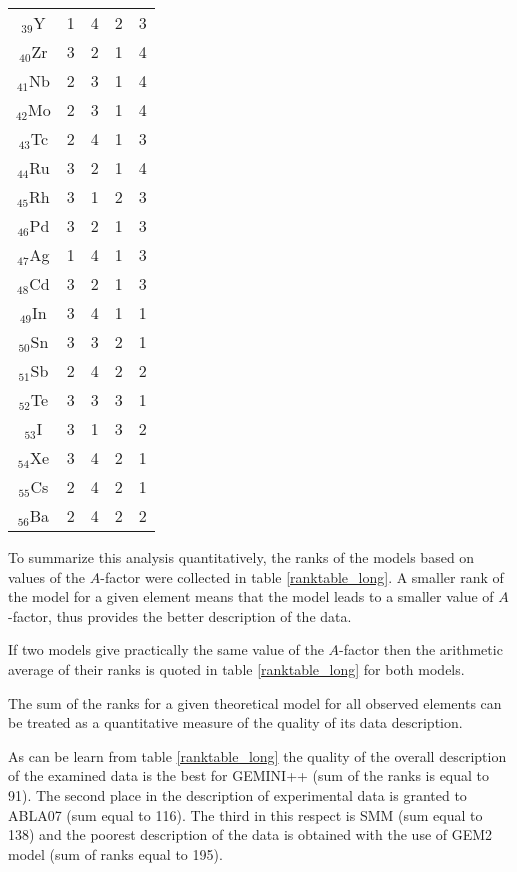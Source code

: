 \begin{longtable}[c]{| c || c |c|c|c|}
$_{39}$Y & 1 & 4 & 2 & 3 \\
$_{40}$Zr & 3 & 2 & 1 & 4 \\
$_{41}$Nb & 2 & 3 & 1 & 4 \\
$_{42}$Mo & 2 & 3 & 1 & 4 \\
$_{43}$Tc & 2 & 4 & 1 & 3 \\
$_{44}$Ru & 3 & 2 & 1 & 4 \\
$_{45}$Rh & 3 & 1 & 2 & 3 \\
$_{46}$Pd & 3 & 2 & 1 & 3 \\
$_{47}$Ag & 1 & 4 & 1 & 3 \\
$_{48}$Cd & 3 & 2 & 1 & 3 \\
$_{49}$In & 3 & 4 & 1 & 1 \\
$_{50}$Sn & 3 & 3 & 2 & 1 \\
$_{51}$Sb & 2 & 4 & 2 & 2 \\
$_{52}$Te & 3 & 3 & 3 & 1 \\
$_{53}$I & 3 & 1 & 3 & 2 \\
$_{54}$Xe & 3 & 4 & 2 & 1 \\
$_{55}$Cs & 2 & 4 & 2 & 1 \\
$_{56}$Ba & 2 & 4 & 2 & 2 \\
\end{longtable}
To summarize this analysis quantitatively, the ranks 
of the models based on values of the $A$-factor were collected
in table \ref{ranktable_long}.
A smaller rank of the model for a given element
means that the model leads to a smaller value of  $A$-factor, thus provides the better description of the data.

If two models give practically the same value of the $A$-factor
then the arithmetic average of their ranks is quoted
in table \ref{ranktable_long} for both models.

The sum of the ranks for a given theoretical 
model for all observed elements can be treated
as a quantitative measure of the quality of its  data description.

As can be learn from table \ref{ranktable_long} the quality of the overall 
description of the examined data is the best for GEMINI++ (sum of the ranks is equal to 91). 
The second place in the description of experimental data
is granted to ABLA07 (sum equal to 116). The
third in this respect is SMM (sum equal to 138) and the poorest description of the data is obtained with the use of GEM2 model (sum of ranks equal to 195).

